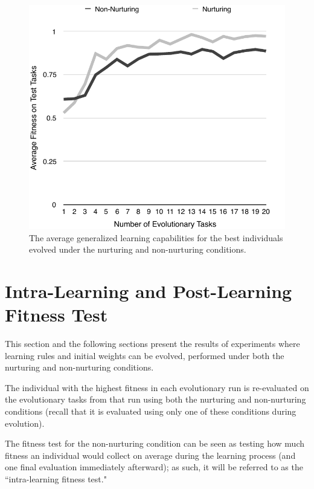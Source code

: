 \documentclass[master]{outhesis}
\begin{document}

\begin{figure}[H]
	\centering
	\includegraphics{ChalmersLearningTest.pdf}
	\caption{The average generalized learning capabilities for the best individuals evolved under the nurturing and non-nurturing conditions.}
	\label{fig:ChalmersLearningTest}
\end{figure}

\section{Intra-Learning and Post-Learning Fitness Test}

This section and the following sections present the results of experiments where learning rules and initial weights can be evolved, performed under both the nurturing and non-nurturing conditions.

The individual with the highest fitness in each evolutionary run is re-evaluated on the evolutionary tasks from that run using both the nurturing and non-nurturing conditions (recall that it is evaluated using only one of these conditions during evolution).

The fitness test for the non-nurturing condition can be seen as testing how much fitness an individual would collect on average during the learning process (and one final evaluation immediately afterward);
as such, it will be referred to as the ``intra-learning fitness test."
\end{document}
